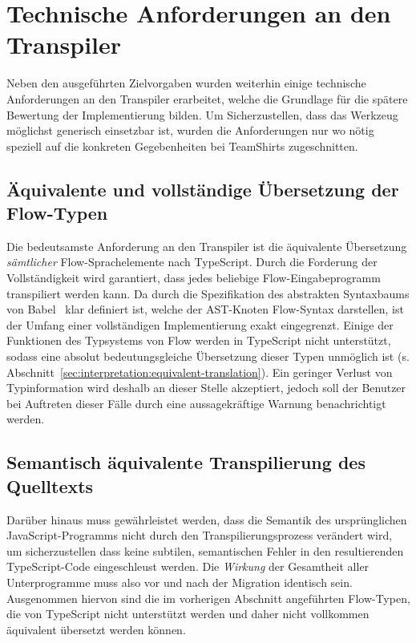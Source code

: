 \section{Technische Anforderungen an den Transpiler}
\label{sec:requirements}

Neben den ausgeführten Zielvorgaben wurden weiterhin einige technische Anforderungen an den Transpiler erarbeitet, welche die Grundlage für die spätere Bewertung der Implementierung bilden. Um Sicherzustellen, dass das Werkzeug möglichst generisch einsetzbar ist, wurden die Anforderungen nur wo nötig speziell auf die konkreten Gegebenheiten bei TeamShirts zugeschnitten.

\subsection{Äquivalente und vollständige Übersetzung der Flow-Typen}
\label{sec:requirement:completeness}

Die bedeutsamste Anforderung an den Transpiler ist die äquivalente Übersetzung \emph{sämtlicher} Flow-Sprachelemente nach TypeScript. Durch die Forderung der Vollständigkeit wird garantiert, dass jedes beliebige Flow-Eingabeprogramm transpiliert werden kann. Da durch die Spezifikation des abstrakten Syntaxbaums von Babel~\autocite{BABEL:PARSER_SPEC} klar definiert ist, welche der AST-Knoten Flow-Syntax darstellen, ist der Umfang einer vollständigen Implementierung exakt eingegrenzt.
Einige der Funktionen des Typsystems von Flow werden in TypeScript nicht unterstützt, sodass eine absolut bedeutungsgleiche Übersetzung dieser Typen unmöglich ist (s. Abschnitt~\ref{sec:interpretation:equivalent-translation}). Ein geringer Verlust von Typinformation wird deshalb an dieser Stelle akzeptiert, jedoch soll der Benutzer bei Auftreten dieser Fälle durch eine aussagekräftige Warnung benachrichtigt werden.

\subsection{Semantisch äquivalente Transpilierung des Quelltexts}
\label{sec:requirement:semantic-equivalence}

Darüber hinaus muss gewährleistet werden, dass die Semantik des ursprünglichen JavaScript-Programms nicht durch den Transpilierungsprozess verändert wird, um sicherzustellen dass keine subtilen, semantischen Fehler in den resultierenden TypeScript-Code eingeschleust werden. Die \emph{Wirkung} der Gesamtheit aller Unterprogramme muss also vor und nach der Migration identisch sein. Ausgenommen hiervon sind die im vorherigen Abschnitt angeführten Flow-Typen, die von TypeScript nicht unterstützt werden und daher nicht vollkommen äquivalent übersetzt werden können.

